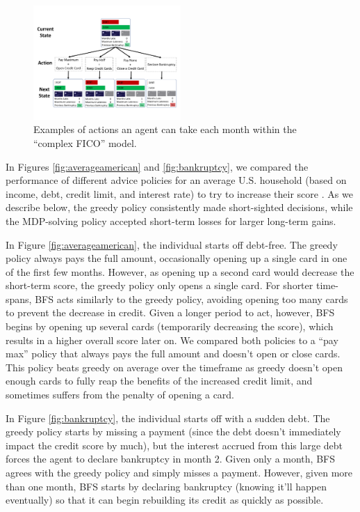 \begin{figure}
    \centering
\vspace*{-.5cm}
\includegraphics[width=0.5\textwidth, trim=0 60 0 0, clip]
{figures/diagram.pdf}
\caption{Examples of actions an agent can take each month within the ``complex FICO'' model.}
\label{fico}
\vspace*{-.5cm}
\end{figure}

In Figures \ref{fig:averageamerican} and \ref{fig:bankruptcy}, we compared the performance of different advice policies for an average U.S. household (based on income, debt, credit limit, and interest rate) to try to increase their score \cite{frankel_2018,mccann_2019,josephson_josephson_2018}. As we describe below, the greedy policy consistently made short-sighted decisions, while the MDP-solving policy accepted short-term losses for larger long-term gains.

In Figure \ref{fig:averageamerican}, the individual starts off debt-free. The greedy policy always pays the full amount, occasionally opening up a single card in one of the first few months. However, as opening up a second card would decrease the short-term score, the greedy policy only opens a single card. For shorter time-spans, BFS acts similarly to the greedy policy, avoiding opening too many cards to prevent the decrease in credit. 
Given a longer period to act, however, BFS begins by opening up several cards (temporarily decreasing the score), which results in a higher overall score later on. We compared both policies to a ``pay max'' policy that always pays the full amount and doesn't open or close cards. This policy beats greedy on average over the timeframe as greedy doesn't open enough cards to fully reap the benefits of the increased credit limit, and sometimes suffers from the penalty of opening a card.

In Figure \ref{fig:bankruptcy}, the individual starts off with a sudden debt. The greedy policy starts by missing a payment (since the debt doesn't immediately impact the credit score by much), but the interest accrued from this large debt forces the agent to declare bankruptcy in month 2. Given only a month, BFS agrees with the greedy policy and simply misses a payment. However, given more than one month, BFS starts by declaring bankruptcy (knowing it'll happen eventually) so that it can begin rebuilding its credit as quickly as possible.

